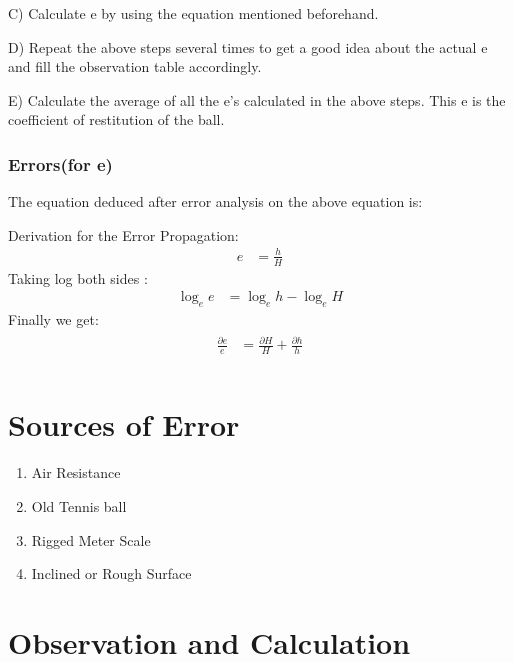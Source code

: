 \documentclass[11pt]{scrartcl} %
\begin{document}
C) Calculate e by using the equation mentioned beforehand. \par

D) Repeat the above steps several times to get a good idea about the actual e and fill the observation table accordingly. \par

E) Calculate the average of all the e’s calculated in the above steps. This e is the coefficient of restitution of the ball. \par

\subsubsection{Errors(for e)}
The equation deduced after error analysis on the above equation is:\par
Derivation for the Error Propagation:
\begin{align} 
		e &= \frac{h}{H} \nonumber
\end{align}
Taking log both sides :
\begin{align}
\log_e e &= \log_e h - \log_e H \nonumber
\end{align}
   Finally we get:
\begin{align} 
	\begin{split}
		\frac{\partial{e}}{e} &= \frac{\partial{H}}{H} + \frac{\partial{h}}{h}\\
	\end{split}					
\end{align}

\section{Sources of Error}
\begin{enumerate}
	\item Air Resistance
	\item Old Tennis ball
	\item Rigged Meter Scale
	\item Inclined or Rough Surface
\end{enumerate}
\newpage

\section{Observation and Calculation}
\end{document}

